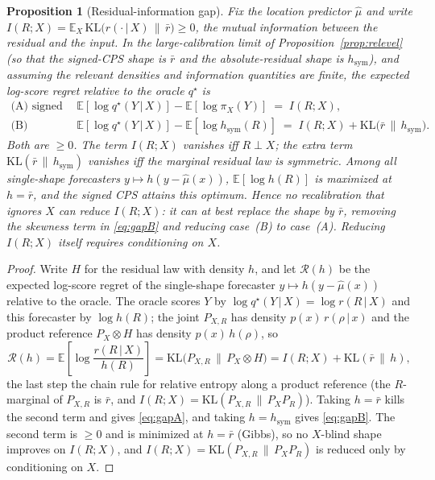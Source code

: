 \documentclass[11pt]{article}
\newtheorem{proposition}{Proposition}
\theoremstyle{definition}
\newcommand{\E}{\mathbb{E}}
\newcommand{\KL}{\mathrm{KL}}
\newcommand{\given}{\,\vert\,}
\begin{document}
\begin{proposition}[Residual-information gap]\label{prop:gap}
Fix the location predictor $\hat\mu$ and write
$I(R;X)=\E_X\,\KL\!\big(r(\cdot\given X)\,\|\,\bar r\big)\ge 0$, the mutual information
between the residual and the input. In the large-calibration limit of
Proposition~\ref{prop:relevel} (so that the signed-CPS shape is $\bar r$ and the
absolute-residual shape is $h_{\mathrm{sym}}$), and assuming the relevant densities and
information quantities are finite, the expected log-score regret relative to the oracle
$q^\star$ is
\begin{align}
  \text{(A) signed CPS:}\quad
  &\E[\log q^\star(Y\given X)]-\E[\log \pi_X(Y)] \;=\; I(R;X), \label{eq:gapA}\\[2pt]
  \text{(B) absolute intervals:}\quad
  &\E[\log q^\star(Y\given X)]-\E[\log h_{\mathrm{sym}}(R)] \;=\; I(R;X)
     +\KL\!\big(\bar r\,\|\,h_{\mathrm{sym}}\big). \label{eq:gapB}
\end{align}
Both are $\ge 0$. The term $I(R;X)$ vanishes iff $R\perp X$; the extra term
$\KL(\bar r\,\|\,h_{\mathrm{sym}})$ vanishes iff the marginal residual law is symmetric.
Among all single-shape forecasters $y\mapsto h(y-\hat\mu(x))$, $\E[\log h(R)]$ is maximized
at $h=\bar r$, and the signed CPS attains this optimum. Hence no recalibration that ignores
$X$ can reduce $I(R;X)$: it can at best replace the shape by $\bar r$, removing the
skewness term in \eqref{eq:gapB} and reducing case~(B) to case~(A). Reducing $I(R;X)$
itself requires conditioning on $X$.
\end{proposition}

\begin{proof}
Write $H$ for the residual law with density $h$, and let $\mathcal{R}(h)$ be the expected log-score
regret of the single-shape forecaster $y\mapsto h(y-\hat\mu(x))$ relative to the oracle. The
oracle scores $Y$ by $\log q^\star(Y\given X)=\log r(R\given X)$ and this forecaster by
$\log h(R)$; the joint $P_{X,R}$ has density $p(x)\,r(\rho\given x)$ and the product reference
$P_X\otimes H$ has density $p(x)\,h(\rho)$, so
\begin{equation}\label{eq:master}
  \mathcal{R}(h)=\E\!\left[\log\frac{r(R\given X)}{h(R)}\right]
      =\KL\!\big(P_{X,R}\,\big\|\,P_X\otimes H\big)
      = I(R;X)+\KL(\bar r\,\|\,h),
\end{equation}
the last step the chain rule for relative entropy along a product reference (the $R$-marginal
of $P_{X,R}$ is $\bar r$, and $I(R;X)=\KL(P_{X,R}\,\|\,P_X P_R)$). Taking $h=\bar r$ kills the
second term and gives \eqref{eq:gapA}, and taking $h=h_{\mathrm{sym}}$ gives \eqref{eq:gapB}.
The second term is $\ge 0$ and is minimized at $h=\bar r$ (Gibbs), so no $X$-blind shape improves
on $I(R;X)$, and $I(R;X)=\KL(P_{X,R}\,\|\,P_X P_R)$ is reduced only by conditioning on $X$.
\end{proof}
\end{document}
